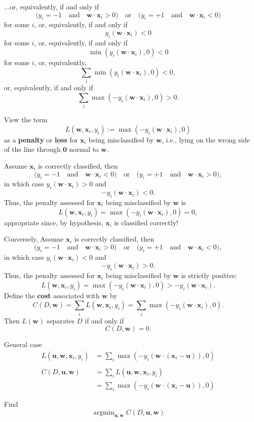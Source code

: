 \documentclass{beamer}
\newcommand{\vu}{\boldsymbol{u}}
\renewcommand{\vw}{\boldsymbol{w}}
\renewcommand{\vx}{\boldsymbol{x}}
\newcommand{\vzero}{\boldsymbol{0}}
\DeclareMathOperator*{\Argmin}{argmin}
\begin{document}
\begin{frame}{}
    
    ...or, equivalently, if and only if
    \[
        \Big(y_i = -1\quad\text{and}\quad \vw\cdot\vx_i >0\Big)
        \quad\text{or}\quad
        \Big(y_i = +1\quad\text{and}\quad \vw\cdot\vx_i <0\Big)
    \]
    for some $i$, or, equivalently, if and only if
    \[
        y_i (\vw\cdot\vx_i) <0
    \]
    for some $i$, or, equivalently, if and only if
    \[
        \min(y_i (\vw\cdot\vx_i), 0) < 0
    \]
    for some $i$, or, equivalently,
    \[
        \sum_i\min(y_i (\vw\cdot\vx_i), 0) < 0,
    \]
    or, equivalently, if and only if
    \[
        \sum_i\max(-y_i (\vw\cdot\vx_i), 0) > 0.
    \]
\end{frame}

\begin{frame}
    View the term
    \[
        L(\vw, \vx_i, y_i) :=\max(-y_i(\vw\cdot\vx_i), 0)
    \]
    as a \textbf{penalty} or \textbf{loss} for $\vx_i$ being misclassified by $\vw$,
    i.e., lying on the wrong side of the line through $\vzero$ normal to $\vw$.

    Assume $\vx_i$ is correctly classified, then
    \[
        \Big(y_i = -1\quad\text{and}\quad \vw\cdot\vx_i <0\Big)
        \quad\text{or}\quad
        \Big(y_i = +1\quad\text{and}\quad \vw\cdot\vx_i >0\Big),
    \]
    in which case $y_i(\vw\cdot\vx_i)>0$ and 
    \[
         -y_i(\vw\cdot\vx_i) < 0.
    \]
    Thus, the penalty assessed for $\vx_i$ being misclassified by $\vw$
    is
    \[
        L(\vw, \vx_i, y_i) = \max(-y_i(\vw\cdot\vx_i), 0) = 0,
    \]
    appropriate since, by hypothesis, $\vx_i$ is classified correctly!
\end{frame}

\begin{frame}{}
    Conversely, Assume $\vx_i$ is correctly classified, then
    \[
        \Big(y_i = -1\quad\text{and}\quad \vw\cdot\vx_i >0\Big)
        \quad\text{or}\quad
        \Big(y_i = +1\quad\text{and}\quad \vw\cdot\vx_i <0\Big),
    \]
    in which case $y_i(\vw\cdot\vx_i)<0$ and 
    \[
         -y_i(\vw\cdot\vx_i) > 0.
    \]
    Thus, the penalty assessed for $\vx_i$ being misclassified by $\vw$
    is strictly positive:
    \[
        L(\vw, \vx_i, y_i) = \max(-y_i(\vw\cdot\vx_i), 0) > -y_i(\vw\cdot\vx_i).
    \]
    Define the \textbf{cost} associated with $\vw$ by
    \[
        C(D, \vw) = \sum_i L(\vw, \vx_i, y_i)
        = \sum_i \max(-y_i(\vw\cdot\vx_i), 0).
    \]
    Then $L(\vw)$ separates $D$ if and only if \[C(D, \vw)=0.\]
\end{frame}

\begin{frame}{General case}
    \begin{align*}
        L(\vu, \vw, \vx_i, y_i) &=\sum_i \max(-y_i(\vw\cdot(\vx_i - \vu)), 0)\\
        \\
        C(D, \vu, \vw) &= \sum_i L(\vu, \vw, \vx_i, y_i)\\
        &=\sum_i \max(-y_i(\vw\cdot(\vx_i - \vu)), 0)
    \end{align*}

    Find
    \[
        \Argmin_{\vu, \vw} C(D, \vu, \vw)
    \]
\end{frame}
\end{document}
